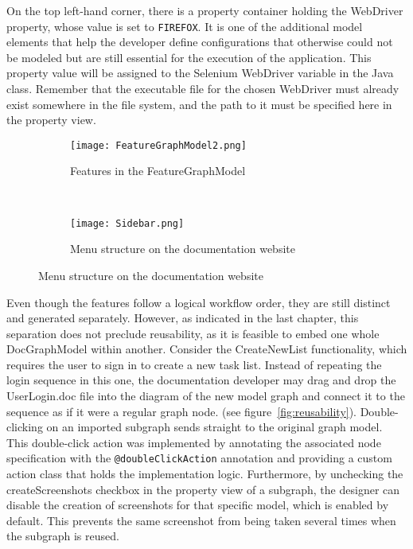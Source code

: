 On the top left-hand corner, there is a property container holding the WebDriver property, whose value is set to \lstinline[language=MGL]{FIREFOX}. It is one of the additional model elements that help the developer define configurations that otherwise could not be modeled but are still essential for the execution of the application. This property value will be assigned to the Selenium WebDriver variable in the Java class. Remember that the executable file for the chosen WebDriver must already exist somewhere in the file system, and the path to it must be specified here in the property view.

\begin{figure}[H]
    \begin{subfigure}[b]{0.5\textwidth}
        \texttt{[image: FeatureGraphModel2.png]}
        \caption{Features in the FeatureGraphModel}
        \label{fig:featGraph}
    \end{subfigure}
    ~
    \begin{subfigure}[b]{0.5\textwidth}
        \texttt{[image: Sidebar.png]}
        \caption{Menu structure on the documentation website}
        \label{fig:sidebar}
    \end{subfigure}
\end{figure}

Even though the features follow a logical workflow order, they are still distinct and generated separately. However, as indicated in the last chapter, this separation does not preclude reusability, as it is feasible to embed one whole DocGraphModel within another. Consider the CreateNewList functionality, which requires the user to sign in to create a new task list. Instead of repeating the login sequence in this one, the documentation developer may drag and drop the UserLogin.doc file into the diagram of the new model graph and connect it to the sequence as if it were a regular graph node. (see figure~\ref{fig:reusability}). Double-clicking on an imported subgraph sends straight to the original graph model. This double-click action was implemented by annotating the associated node specification with the \lstinline[language=MGL]{@doubleClickAction} annotation and providing a custom action class that holds the implementation logic. Furthermore, by unchecking the createScreenshots checkbox in the property view of a subgraph, the designer can disable the creation of screenshots for that specific model, which is enabled by default. This prevents the same screenshot from being taken several times when the subgraph is reused.

